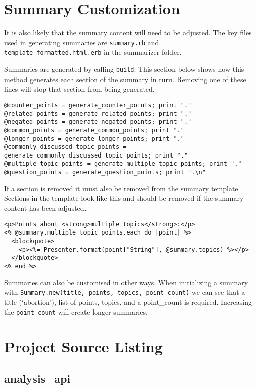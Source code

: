 \section{Summary Customization}

It is also likely that the summary content will need to be adjusted. The
key files used in generating summaries are \texttt{summary.rb} and
\texttt{template\_formatted.html.erb} in the summarizer folder.

Summaries are generated by calling \texttt{build}. This section below
shows how this method generates each section of the summary in turn.
Removing one of these lines will stop that section from being generated.

\begin{verbatim}
@counter_points = generate_counter_points; print "."
@related_points = generate_related_points; print "."
@negated_points = generate_negated_points; print "."
@common_points = generate_common_points; print "."
@longer_points = generate_longer_points; print "."
@commonly_discussed_topic_points = generate_commonly_discussed_topic_points; print "."
@multiple_topic_points = generate_multiple_topic_points; print "."
@question_points = generate_question_points; print ".\n"
\end{verbatim}

If a section is removed it must also be removed from the summary
template. Sections in the template look like this and should be removed
if the summary content has been adjusted.

\begin{verbatim}
<p>Points about <strong>multiple topics</strong>:</p>
<% @summary.multiple_topic_points.each do |point| %>
  <blockquote>
    <p><%= Presenter.format(point["String"], @summary.topics) %></p>
  </blockquote>
<% end %>
\end{verbatim}

Summaries can also be customised in other ways. When initializing a
summary with
\texttt{Summary.new(title,\ points,\ topics,\ point\_count)} we can see
that a title (`abortion'), list of points, topics, and a point\_count is
required. Increasing the \texttt{point\_count} will create longer
summaries.

\section{Project Source Listing}

\subsection*{analysis\_api}

